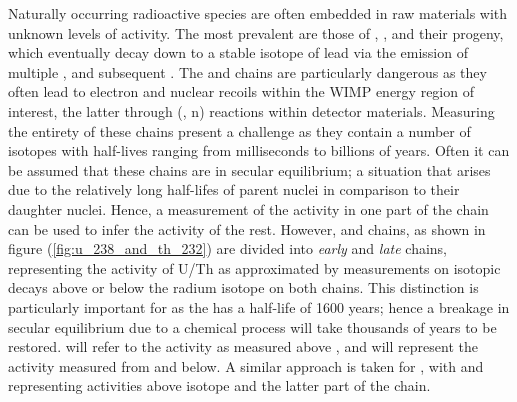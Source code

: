 Naturally occurring radioactive species are often embedded in raw materials with unknown levels of activity. The most prevalent are those of \UTTE{}, \UTTF{}, \ThTTT{} and their progeny, which eventually decay down to a stable isotope of lead via the emission of multiple \alpha{}, \beta{} and subsequent \grays{}. The \UTTE{} and \ThTTT{} chains are particularly dangerous as they often lead to electron and nuclear recoils within the WIMP energy region of interest, the latter through (\alpha, n) reactions within detector materials. 
Measuring the entirety of these chains present a challenge as they contain a number of isotopes with half-lives ranging from milliseconds to billions of years. Often it can be assumed that these chains are in secular equilibrium; a situation that arises due to the relatively long half-lifes of parent nuclei in comparison to their daughter nuclei. Hence, a measurement of the activity in one part of the chain can be used to infer the activity of the rest. 
However, \UTTE{} and \ThTTT{} chains, as shown in figure (\ref{fig:u_238_and_th_232}) are divided into \textit{early} and \textit{late} chains, representing the activity of U/Th as approximated by measurements on isotopic decays above or below the radium isotope on both chains. This distinction is particularly important for \UTTE{} as the \RaTTS{} has a half-life of 1600 years; hence a breakage in secular equilibrium due to a chemical process will take thousands of years to be restored. \UTTEe{} will refer to the \UTTE{} activity as measured above \RaTTS{}, and \UTTEl{} will represent the activity measured from \RaTTS{} and below. A similar approach is taken for \ThTTT{}, with \ThTTTe{} and \ThTTTl{} representing activities above \RaTTE{} isotope and the latter part of the chain.
%
